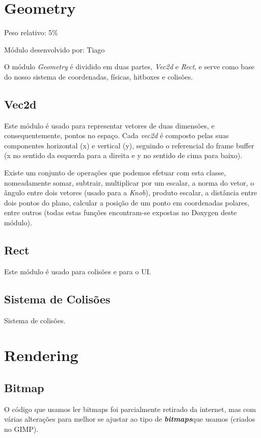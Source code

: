 \documentclass{report}
\begin{document}
\section{Geometry}


Peso relativo: 5\%

Módulo desenvolvido por: Tiago

O módulo \textit{Geometry} é dividido em duas partes, \textit{Vec2d} e \textit{Rect}, e serve como base do nosso sistema de coordenadas, físicas, hitboxes e colisões. 
\subsection{Vec2d}

Este módulo é usado para representar vetores de duas dimensões, e consequentemente, pontos no espaço. Cada \textit{vec2d} é composto pelas suas componentes horizontal (x) e vertical (y), seguindo o referencial do frame buffer (x no sentido da esquerda para a direita e y no sentido de cima para baixo).

Existe um conjunto de operações que podemos efetuar com esta classe, nomeadamente somar, subtrair, multiplicar por um escalar, a norma do vetor, o ângulo entre dois vetores (usado para a \textit{Knob}), produto escalar, a distância entre dois pontos do plano, calcular a posição de um ponto em coordenadas polares, entre outros (todas estas funções encontram-se expostas no Doxygen deste módulo).

\subsection{Rect}

Este módulo é usado para colisões e para o UI. 

\subsection{Sistema de Colisões}

Sistema de colisões.

\section{Rendering}

\subsection{Bitmap}

O código que usamos ler bitmaps foi parcialmente retirado da internet, mas com várias alterações para melhor se ajustar ao tipo de \textbf{\textit{bitmaps}}que usamos (criados no GIMP).
\end{document}
